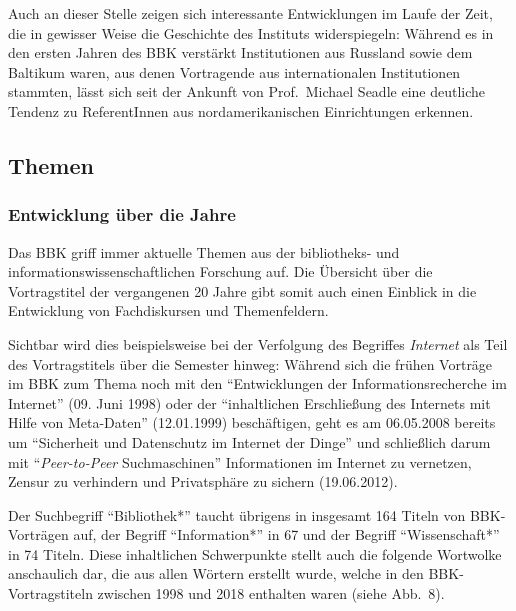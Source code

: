 \documentclass[a4paper,
fontsize=11pt,
oneside,
numbers=noperiodatend,
parskip=half-,
bibliography=totoc,
final
]{scrartcl}
\begin{document}
Auch an dieser Stelle zeigen sich interessante Entwicklungen im Laufe
der Zeit, die in gewisser Weise die Geschichte des Instituts
widerspiegeln: Während es in den ersten Jahren des BBK verstärkt
Institutionen aus Russland sowie dem Baltikum waren, aus denen
Vortragende aus internationalen Institutionen stammten, lässt sich seit
der Ankunft von Prof.~Michael Seadle eine deutliche Tendenz zu
ReferentInnen aus nordamerikanischen Einrichtungen erkennen.

\hypertarget{themen}{%
\subsection{Themen}\label{themen}}

\hypertarget{entwicklung-uxfcber-die-jahre}{%
\subsubsection{Entwicklung über die
Jahre}\label{entwicklung-uxfcber-die-jahre}}

Das BBK griff immer aktuelle Themen aus der bibliotheks- und
informationswissenschaftlichen Forschung auf. Die Übersicht über die
Vortragstitel der vergangenen 20 Jahre gibt somit auch einen Einblick in
die Entwicklung von Fachdiskursen und Themenfeldern.

Sichtbar wird dies beispielsweise bei der Verfolgung des Begriffes
\emph{Internet} als Teil des Vortragstitels über die Semester hinweg:
Während sich die frühen Vorträge im BBK zum Thema noch mit den
\enquote{Entwicklungen der Informationsrecherche im Internet} (09. Juni
1998) oder der \enquote{inhaltlichen Erschließung des Internets mit
Hilfe von Meta-Daten} (12.01.1999) beschäftigen, geht es am 06.05.2008
bereits um \enquote{Sicherheit und Datenschutz im Internet der Dinge}
und schließlich darum mit \enquote{\emph{Peer-to-Peer} Suchmaschinen}
Informationen im Internet zu vernetzen, Zensur zu verhindern und
Privatsphäre zu sichern (19.06.2012).

Der Suchbegriff \enquote{Bibliothek*} taucht übrigens in insgesamt 164
Titeln von BBK-Vorträgen auf, der Begriff \enquote{Information*} in 67
und der Begriff \enquote{Wissenschaft*} in 74 Titeln. Diese inhaltlichen
Schwerpunkte stellt auch die folgende Wortwolke anschaulich dar, die aus
allen Wörtern erstellt wurde, welche in den BBK-Vortragstiteln zwischen
1998 und 2018 enthalten waren (siehe Abb.~8).
\end{document}
